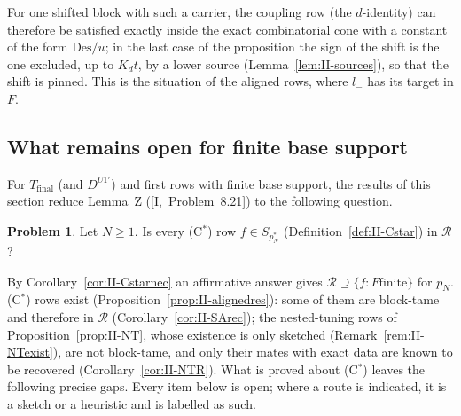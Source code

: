\documentclass[10pt]{amsart}
\theoremstyle{definition}
\newtheorem{problem}[theorem]{Problem}
\theoremstyle{remark}
\newcommand{\Rec}{\mathcal R}
\begin{document}
For one shifted block with such a carrier, the coupling row (the $d$-identity) can
therefore be satisfied exactly inside the exact combinatorial cone with a constant
of the form $\mathrm{Des}/u$; in the last case of the proposition the sign of the shift
is the one excluded, up to $K_dt$, by a lower source (Lemma~\ref{lem:II-sources}),
so that the shift is pinned.  This is the situation of the aligned rows, where $l_-$
has its target in $F$.

\subsection{What remains open for finite base support}\label{subsec:II-open}

For $T_{\mathrm{final}}$ (and $D^{U1'}$) and first rows with finite base support,
the results of this section reduce Lemma~Z ([I,~Problem~8.21]) to the following
question.

\begin{problem}\label{prob:II-Cstar}
Let $N\ge1$.  Is every \textup{(C$^*$)} row $f\in S_{p_N^*}$ \textup{(}Definition~\ref{def:II-Cstar}\textup{)}
in $\Rec$?
\end{problem}

By Corollary~\ref{cor:II-Cstarnec} an affirmative answer gives $\Rec\supseteq\{f:F\text{
finite}\}$ for $p_N$.  (C$^*$) rows exist (Proposition~\ref{prop:II-alignedres}): some of
them are block-tame and therefore in $\Rec$ (Corollary~\ref{cor:II-SArec}); the
nested-tuning rows of Proposition~\ref{prop:II-NT}, whose existence is only sketched
(Remark~\ref{rem:II-NTexist}), are not block-tame, and only their mates with exact data
are known to be recovered (Corollary~\ref{cor:II-NTR}).  What is proved about
(C$^*$) leaves the following precise gaps.  Every item below is open; where a route is
indicated, it is a sketch or a heuristic and is labelled as such.
\end{document}
